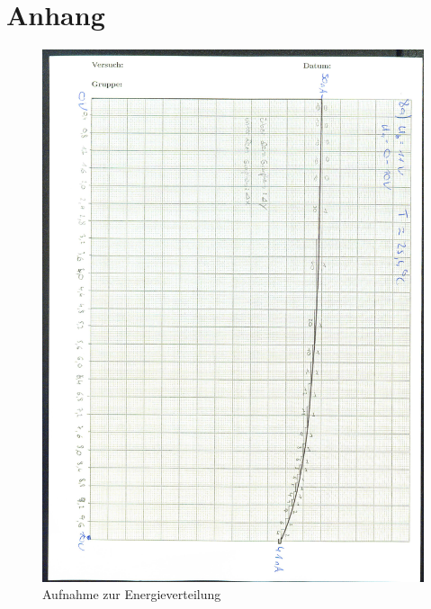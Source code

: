 \section{Anhang}
\begin{figure}[H]
  \centering
  \includegraphics[width=\textwidth]{content/downKurve.jpg}
  \caption{Aufnahme zur Energieverteilung}
  \label{Bild:1}
\end{figure}
